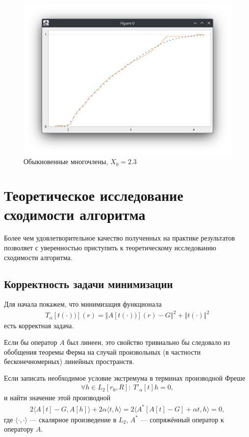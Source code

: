 \documentclass[a4paper,14pt]{extarticle}
\newcommand{\norm}[1]{\left\Vert #1 \right\Vert}
\begin{document}
    \begin{figure}[h]
        \centering
        \includegraphics[scale=0.5]{images/poly23}
        \caption{Обыкновенные многочлены, $X_0 = 2.3$}
    \end{figure}

    \newpage

    \section{Теоретическое исследование сходимости алгоритма}

    Более чем удовлетворительное качество полученных на практике результатов
    позволяет с уверенностью приступить к теоретическому исследованию сходимости
    алгоритма.

    \subsection{Корректность задачи минимизации}\label{subsec:well_posedness}

    Для начала покажем, что минимизация функционала
    \begin{gather*}
        T_{\alpha}[t(\cdot))](r)
        = \norm{A[t(\cdot))](r) - G}^2
        + \norm{t(\cdot)}^2
    \end{gather*}
    есть корректная задача.

    Если бы оператор $A$ был линеен, это свойство тривиально бы следовало из
    обобщения теоремы Ферма на случай произвольных (в частности
    бесконечномерных) линейных пространств.

    Если записать необходимое условие экстремума в терминах производной Фреше
    \begin{gather*}
        \forall h \in L_2[r_0, R]: \
        T'_{\alpha}[t] h = 0,
    \end{gather*}
    и найти значение этой производной
    \begin{gather}
        2 \langle A[t] - G, A[h] \rangle
        + 2 \alpha \langle t, h \rangle
        = 2 \langle A^*[A[t] - G] + \alpha t , h\rangle
        = 0,
    \end{gather}
    где $\langle \cdot, \cdot \rangle$ --- скалярное произведение в $L_2$,
    $A^*$ --- сопряжённый оператор к оператору $A$.
\end{document}
